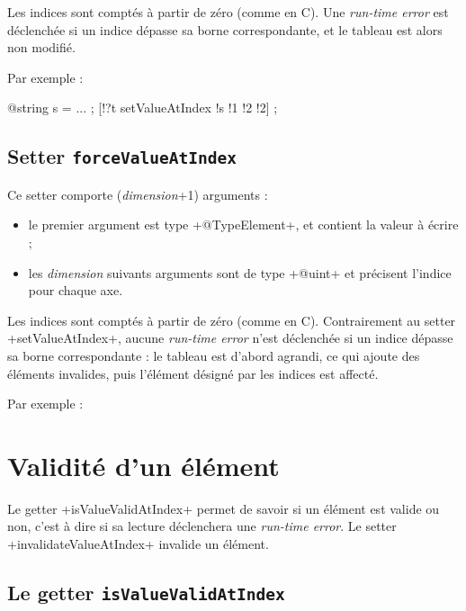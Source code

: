 Les indices sont comptés à partir de zéro (comme en C). Une \emph{run-time error} est déclenchée si un indice dépasse sa borne correspondante, et le tableau est alors non modifié.

Par exemple :
\begin{galgascode}
  @string s = ... ;
  [!?t setValueAtIndex !s !1 !2 !2] ;
\end{galgascode}





\subsection{Setter \texttt{forceValueAtIndex}}

Ce setter comporte (\emph{dimension}+1) arguments :
\begin{itemize}
  \item le premier argument est type \ggs+@TypeElement+, et contient la valeur à écrire ;
  \item les \emph{dimension} suivants arguments sont de type \ggs+@uint+ et précisent l'indice pour chaque axe.
\end{itemize} 
  
Les indices sont comptés à partir de zéro (comme en C). Contrairement au setter \ggs+setValueAtIndex+, aucune \emph{run-time error} n'est déclenchée si un indice dépasse sa borne correspondante : le tableau est d'abord agrandi, ce qui ajoute des éléments invalides, puis l'élément désigné par les indices est affecté.

Par exemple :
\begin{galgascode}
  @string s = ... ;
  [}?t forceValueAtIndex !s !5 !4 !4] ;
\end{galgascode}





\section{Validité d'un élément}

Le getter \ggs+isValueValidAtIndex+ permet de savoir si un élément est valide ou non, c'est à dire si sa lecture déclenchera une \emph{run-time error}. Le setter \ggs+invalidateValueAtIndex+ invalide un élément.

\subsection{Le getter \texttt{isValueValidAtIndex}}


